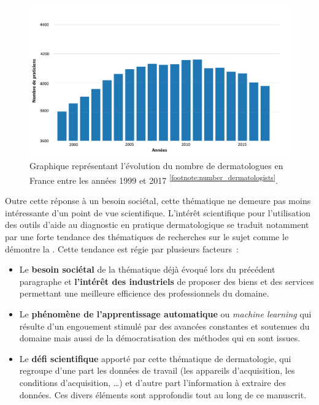 \begin{figure}[H]
    \centering
    \includegraphics[width=\linewidth]{contents/i_introduction/resources/evolution_dermatologists.pdf}
    \caption{Graphique représentant l'évolution du nombre de dermatologues en France entre les années 1999 et 2017 \textsuperscript{\ref{footnote:number_dermatologists}}.}
    \label{fig:number_dermatologists}
\end{figure}\par
\addtocounter{footnote}{1}

Outre cette réponse à un besoin sociétal, cette thématique ne demeure pas moins intéressante d’un point de vue scientifique. L’intérêt scientifique pour l'utilisation des outils d'aide au diagnostic en pratique dermatologique se traduit notamment par une forte tendance des thématiques de recherches sur le sujet comme le démontre la . Cette tendance est régie par plusieurs facteurs~:
\begin{itemize}
    \item Le \textbf{besoin sociétal} de la thématique déjà évoqué lors du précédent paragraphe et \textbf{l'intérêt des industriels} de proposer des biens et des services permettant une meilleure efficience des professionnels du domaine.
    \item Le \textbf{phénomène de l'apprentissage automatique} ou \textit{machine learning} qui résulte d'un engouement stimulé par des avancées constantes et soutenues du domaine mais aussi de la démocratisation des méthodes qui en sont issues. 
    \item Le \textbf{défi scientifique} apporté par cette thématique de dermatologie, qui regroupe d'une part les données de travail (les appareils d'acquisition, les conditions d'acquisition, \ldots) et d'autre part l'information à extraire des données. Ces divers éléments sont approfondis tout au long de ce manuscrit.
\end{itemize}\par
\clearpage

